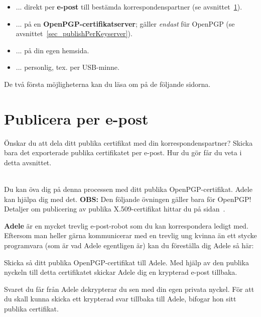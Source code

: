 \documentclass[a4paper,11pt, oneside,openright,titlepage,dvips]{scrbook}
\newcommand\margin[1]{\marginline {\sffamily\scriptsize #1}}
\newcommand{\IncludeImage}[2][]{\texorhtml{%
\texttt{[image: \#2]}%
}{%
\htmlimg{#2.png}%
}}
\newcounter{part}
\newcounter{chapter}
\newcounter{section}[chapter]
\begin{document}
\begin{itemize}
    \item ... direkt per \textbf{e-post} till bestämda
    korrespondenspartner (se avsnittet~\ref{sec_publishPerEmail}).
    \item ... på en \textbf{OpenPGP-certifikatserver};
    gäller \textit{endast} für OpenPGP (se avsnittet~\ref{sec_publishPerKeyserver}).
    \item ... på din egen hemsida.
    \item ... personlig, tex. per USB-minne.
\end{itemize}

De två första möjligheterna kan du läsa om på de följande sidorna.

\clearpage
\section{Publicera per e-post}
\label{sec_publishPerEmail}

Önskar du att dela ditt publika certifikat med din korrespondenspartner?
Skicka bara det exporterade publika certifikatet per e-post. Hur du gör
får du veta i detta avsnittet.

~\\
Du kan öva dig på denna processen med ditt publika OpenPGP-certifikat.
Adele kan hjälpa dig med det. \textbf{OBS:} Den följande
övningen gäller bara för OpenPGP! Detaljer om publicering av
publika X.509-certifikat hittar du på
sidan~\pageref{publishPerEmailx509}.
\T\margin{\IncludeImage[width=1.5cm]{openpgp-icon}}

\textbf{Adele}
är en mycket trevlig e-post-robot som du kan korrespondera ledigt
med. Eftersom man heller gärna kommunicerar med en trevlig ung
kvinna än ett stycke programvara (som är vad Adele egentligen är)
kan du föreställa dig Adele så här:

\begin{center}
\IncludeImage{adele01}
\end{center}

Skicka så ditt publika OpenPGP-certifikat till Adele. Med
hjälp av den publika nyckeln till detta certifikatet skickar
Adele dig en krypterad e-post tillbaka.

Svaret du får från Adele dekrypterar du sen med din egen privata
nyckel. För att du skall kunna skicka ett krypterad svar tillbaka
till Adele, bifogar hon sitt publika certifikat.
\end{document}
